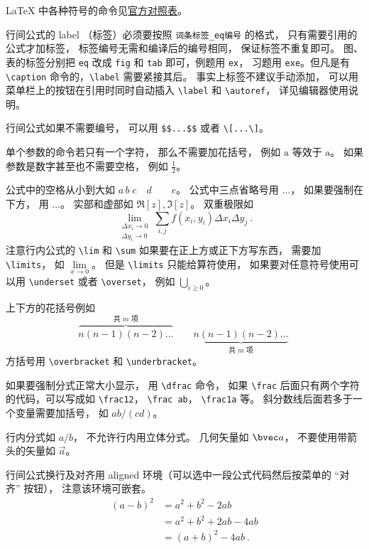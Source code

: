 LaTeX 中各种符号的命令见\href{https://tug.ctan.org/info/symbols/comprehensive/symbols-a4.pdf}{官方对照表}。

行间公式的 label （标签）必须要按照 \verb|词条标签_eq编号| 的格式， 只有需要引用的公式才加标签， 标签编号无需和编译后的编号相同， 保证标签不重复即可。 图、表的标签分别把 \verb|eq| 改成 \verb|fig| 和 \verb|tab| 即可，例题用 \verb|ex|， 习题用 \verb|exe|。但凡是有 \verb|\caption| 命令的，\verb|\label| 需要紧接其后。 事实上标签不建议手动添加， 可以用菜单栏上的按钮在引用时同时自动插入 \verb|\label| 和 \verb|\autoref|， 详见编辑器使用说明。

行间公式如果不需要编号， 可以用 \verb|$$...$$| 或者 \verb|\[...\]|。


单个参数的命令若只有一个字符， 那么不需要加花括号， 例如 $\mathrm a$ 等效于 $\mathrm{a}$。 如果参数是数字甚至也不需要空格， 例如 $\frac12$。

公式中的空格从小到大如 $a\, b\; c\quad d\qquad e$。 公式中三点省略号用 $\dots$， 如果要强制在下方， 用 $\ldots$。 实部和虚部如 $\Re[z], \Im[z]$。 双重极限如
\begin{equation}
\lim_{\substack{\Delta x_i\to 0\\ \Delta y_i\to 0}} \sum_{i, j} f(x_i,y_i) \Delta x_i \Delta y_j~.
\end{equation}
注意行内公式的 \verb|\lim| 和 \verb|\sum| 如果要在正上方或正下方写东西， 需要加 \verb|\limits|， 如 $\lim\limits_{x\to 0}$。 但是 \verb|\limits| 只能给算符使用， 如果要对任意符号使用可以用 \verb|\underset| 或者 \verb|\overset|， 例如 $\underset{i \ge 0}{\bigcup}$。

上下方的花括号例如
\begin{equation}
\overbrace{n(n-1)(n-2)\dots}^{\text{共 $m$ 项}} \qquad \underbrace{n(n-1)(n-2)\dots}_{\text{共 $m$ 项}}~
\end{equation}
方括号用 \verb|\overbracket| 和 \verb|\underbracket|。

如果要强制分式正常大小显示， 用 \verb|\dfrac| 命令， 如果 \verb|\frac| 后面只有两个字符的代码，可以写成如 \verb|\frac12|， \verb|\frac ab|， \verb|\frac1a| 等。 斜分数线后面若多于一个变量需要加括号， 如 $ab/(cd)$。

行内分式如 $a/b$， 不允许行内用立体分式。 几何矢量如 $\bvec a$， 不要使用带箭头的矢量如 $\vec a$。 

行间公式换行及对齐用 aligned 环境（可以选中一段公式代码然后按菜单的 “对齐” 按钮）， 注意该环境可嵌套。
\begin{equation}
\begin{aligned}
(a-b)^2 &= a^2+b^2 - 2ab \\
& = a^2+b^2+2ab-4ab\\
& = (a+b)^2-4ab~.
\end{aligned}
\end{equation}

